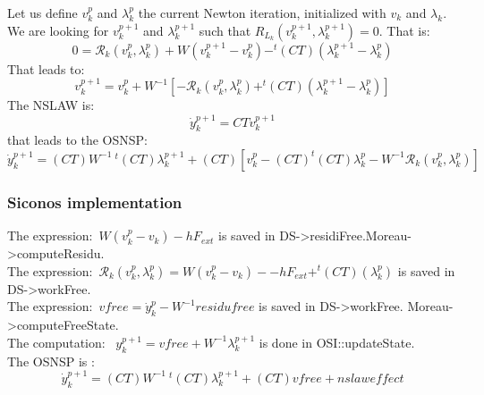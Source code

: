 Let us define $v_k^p$ and $\lambda_k^p$ the current Newton iteration, initialized with $v_k$ and $\lambda_k$.
We are looking for $v_k^{p+1}$ and $\lambda_k^{p+1}$ such that $R_{L_k} (v_k^{p+1},\lambda_k^{p+1}) =0$. That is:
\begin{equation}
  \label{eq:newton_NE1_eq1}
  0 =\mathcal R_k (v_k^p,\lambda_k^p)+W(v_k^{p+1}-v_k^p)-^t(CT)(\lambda_k^{p+1} - \lambda_k^p)
\end{equation}
That leads to:
\begin{equation}
  \label{eq:newton_NE1_eq2}
  v_k^{p+1} =v_k^p+W^{-1}[-\mathcal R_k (v_k^p,\lambda_k^p)+^t(CT)(\lambda_k^{p+1} - \lambda_k^p)]
\end{equation}
The NSLAW is:
\begin{equation}
  \label{eq:newton_NE1_nslaw1}
  \dot y_k^{p+1}=CTv_k^{p+1}
\end{equation}
that leads to the OSNSP:
\begin{equation}
  \label{eq:newton_NE1_osnsp}
  \dot y_k^{p+1}=(CT)W^{-1}~^t(CT)\lambda_k^{p+1}+(CT)[v_k^p-(CT)^t(CT)\lambda_k^p-W^{-1}\mathcal R_k (v_k^p,\lambda_k^p)]
\end{equation}
\subsubsection{Siconos implementation}

The expression:~$W(v_k^p-v_k)-hF_{ext}$ is saved in DS->residiFree.Moreau->computeResidu.\\
The expression:~$\mathcal R_k(v_k^p,\lambda_k^p)=W(v_k^p-v_k)--hF_{ext}+^t(CT)(\lambda_k^p)$ is saved in DS->workFree.\\
The expression:~$vfree=\dot y_k^{p} - W^{-1} residufree$ is saved in DS->workFree. Moreau->computeFreeState.\\
The computation:~ $y_k^{p+1}=vfree+W^{-1}\lambda_k^{p+1}$ is done in OSI::updateState.\\
The OSNSP is :
\begin{equation}
  \dot y_k^{p+1}=(CT)W^{-1}~^t(CT)\lambda_k^{p+1}+(CT)vfree+nslaweffect
\end{equation}
